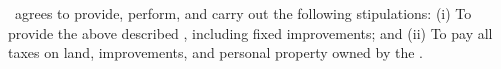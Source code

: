 \lessor\ agrees to provide, perform, and carry out the following stipulations: (i) To provide the above described \property, including fixed improvements; and (ii) To pay all taxes on land, improvements, and personal property owned by the \lessor.
